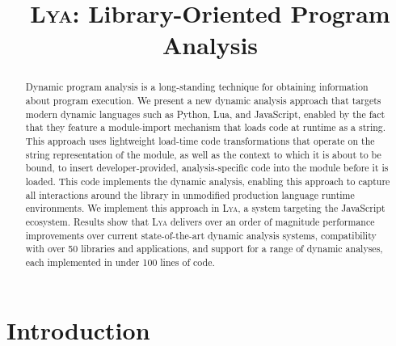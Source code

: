 \documentclass[letterpaper,twocolumn,10pt]{article}
\newcommand{\sys}{{\scshape Lya}\xspace}
\begin{document}

\date{}

\title{\Large \bf \sys: Library-Oriented Program Analysis}

\author{
}

\maketitle

\begin{abstract}

Dynamic program analysis is a long-standing technique for obtaining information about program execution.
We present a new dynamic analysis approach that targets modern dynamic languages such as Python, Lua, and JavaScript, enabled by the fact that they feature a module-import mechanism that loads code at runtime as a string.
This approach uses lightweight load-time code transformations that operate on the string representation of the module, as well as the context to which it is about to be bound, to insert developer-provided, analysis-specific code into the module before it is loaded.
This code implements the dynamic analysis, enabling this approach to capture all interactions around the library in unmodified production language runtime environments.
We implement this approach in \sys, a system targeting the JavaScript ecosystem. 
Results show that \sys delivers over an order of magnitude performance improvements over current state-of-the-art dynamic analysis systems, compatibility with over 50 libraries and applications, and support for a range of dynamic analyses, each implemented in under 100 lines of code.
\end{abstract}

\section{Introduction}
\label{intro}
\end{document}
